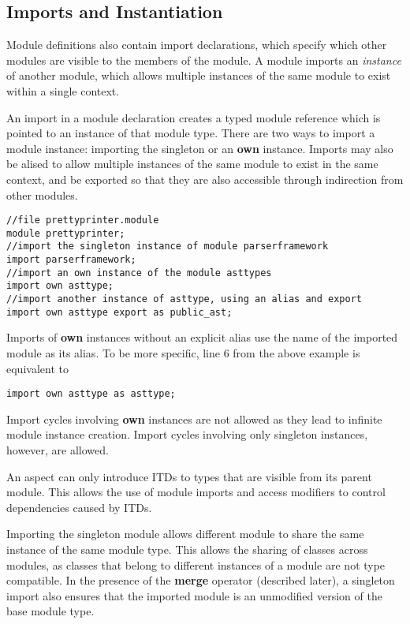 \subsection{Imports and Instantiation}

Module definitions also contain import declarations, which specify which
other modules are visible to the members of the module. A module imports 
an \textit{instance} of another module, which allows multiple instances
of the same module to exist within a single context.

An import in a module declaration creates a typed module reference which is pointed to
an instance of that module type. 
There are two ways to import a module instance: importing the singleton or
an \textbf{own} instance. Imports may also be alised to allow multiple instances
of the same module to exist in the same context, and be exported so that
they are also accessible through indirection from other modules.

\begin{lstlisting}[caption={Imports}, label={figure:imports}]
//file prettyprinter.module
module prettyprinter;
//import the singleton instance of module parserframework
import parserframework; 
//import an own instance of the module asttypes
import own asttype;
//import another instance of asttype, using an alias and export
import own asttype export as public_ast;
\end{lstlisting}

Imports of \textbf{own} instances without an explicit alias use the name
of the imported module as its alias. To be more specific, line 6 from the above
example is equivalent to
\begin{lstlisting}
import own asttype as asttype;
\end{lstlisting}

Import cycles involving \textbf{own} instances are not allowed as they
lead to infinite module instance creation. Import cycles involving only
singleton instances, however, are allowed.

An aspect can only introduce ITDs to types that are visible from its parent module. 
This allows the use of module imports and access modifiers to control dependencies
caused by ITDs.

Importing the singleton module allows different module to share the same instance
of the same module type. This allows the sharing of classes across modules, as
classes that belong to different instances of a module are not type compatible.
In the presence of the \textbf{merge} operator (described later), a singleton import
also ensures that the imported module is an unmodified version of the base module type.

